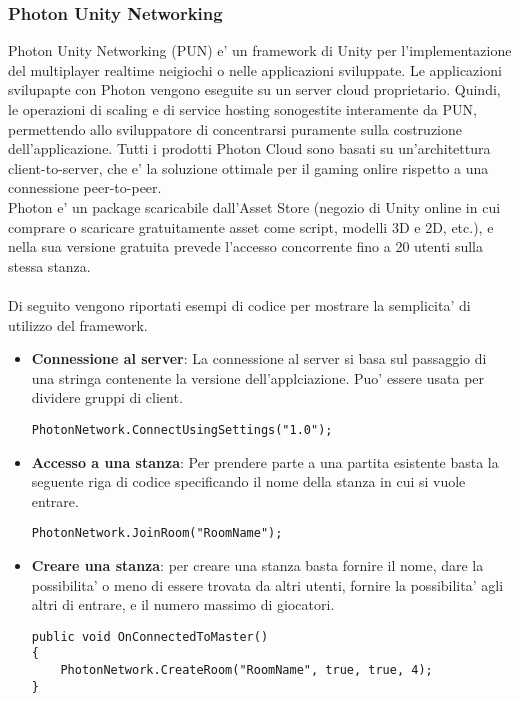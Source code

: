\subsubsection{Photon Unity Networking}
Photon Unity Networking (PUN) e' un framework di Unity per l'implementazione del multiplayer realtime neigiochi o nelle applicazioni sviluppate. Le applicazioni svilupapte con Photon vengono eseguite su un server cloud proprietario. Quindi, le operazioni di scaling e di service hosting sonogestite interamente da PUN, permettendo allo sviluppatore di concentrarsi puramente sulla costruzione dell'applicazione. Tutti i prodotti Photon Cloud sono basati su un'architettura client-to-server, che e' la soluzione ottimale per il gaming onlire rispetto a una connessione peer-to-peer.\\
Photon e' un package scaricabile dall'Asset Store (negozio di Unity online in cui comprare o scaricare gratuitamente asset come script, modelli 3D e 2D, etc.), e nella sua versione gratuita prevede l'accesso concorrente fino a 20 utenti sulla stessa stanza. \\\\
Di seguito vengono riportati esempi di codice per mostrare la semplicita' di utilizzo del framework.\\
\begin{itemize}
	\item \textbf{Connessione al server}: La connessione al server si basa sul passaggio di una stringa contenente la versione dell'applciazione. Puo' essere usata per dividere gruppi di client.
\begin{lstlisting}
PhotonNetwork.ConnectUsingSettings("1.0");
\end{lstlisting}

	\item \textbf{Accesso a una stanza}: Per prendere parte a una partita esistente basta la seguente riga di codice specificando il nome della stanza in cui si vuole entrare.
\begin{lstlisting}
PhotonNetwork.JoinRoom("RoomName");
\end{lstlisting}

	\item \textbf{Creare una stanza}: per creare una stanza basta fornire il nome, dare la possibilita' o meno di essere trovata da altri utenti, fornire la possibilita' agli altri di entrare, e il numero massimo di giocatori.
\begin{lstlisting}
public void OnConnectedToMaster()
{
	PhotonNetwork.CreateRoom("RoomName", true, true, 4);
}

\end{lstlisting}	
	
\end{itemize}

